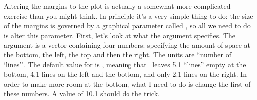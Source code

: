 
Altering the margins to the plot is actually a somewhat more complicated exercise than you might think. In principle it's a very simple thing to do: the size of the margins is governed by a graphical parameter called , so all we need to do is alter this parameter. First, let's look at what the  argument specifies. The  argument is a vector containing four numbers: specifying the amount of space at the bottom, the left, the top and then the right. The units are ``number of `lines'". The default value for  is , meaning that \R\ leaves 5.1 ``lines'' empty at the bottom, 4.1 lines on the left and the bottom, and only 2.1 lines on the right. In order to make more room at the bottom, what I need to do is change the first of these numbers. A value of 10.1 should do the trick. 

